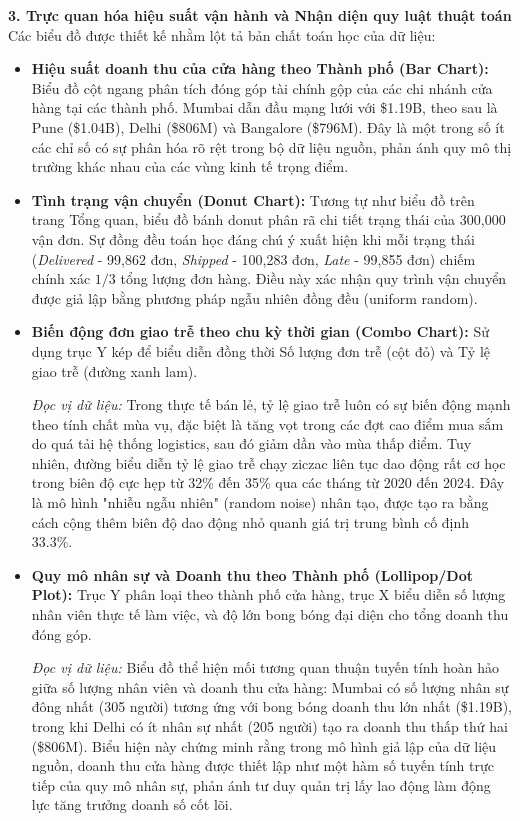 \textbf{3. Trực quan hóa hiệu suất vận hành và Nhận diện quy luật thuật toán} \\
Các biểu đồ được thiết kế nhằm lột tả bản chất toán học của dữ liệu:
\begin{itemize}
    \item \textbf{Hiệu suất doanh thu của cửa hàng theo Thành phố (Bar Chart):} 
    Biểu đồ cột ngang phân tích đóng góp tài chính gộp của các chi nhánh cửa hàng tại các thành phố. Mumbai dẫn đầu mạng lưới với \$1.19B, theo sau là Pune (\$1.04B), Delhi (\$806M) và Bangalore (\$796M). Đây là một trong số ít các chỉ số có sự phân hóa rõ rệt trong bộ dữ liệu nguồn, phản ánh quy mô thị trường khác nhau của các vùng kinh tế trọng điểm.
    
    \item \textbf{Tình trạng vận chuyển (Donut Chart):} 
    Tương tự như biểu đồ trên trang Tổng quan, biểu đồ bánh donut phân rã chi tiết trạng thái của 300,000 vận đơn. Sự đồng đều toán học đáng chú ý xuất hiện khi mỗi trạng thái (\textit{Delivered} - 99,862 đơn, \textit{Shipped} - 100,283 đơn, \textit{Late} - 99,855 đơn) chiếm chính xác $1/3$ tổng lượng đơn hàng. Điều này xác nhận quy trình vận chuyển được giả lập bằng phương pháp ngẫu nhiên đồng đều (uniform random).
    
    \item \textbf{Biến động đơn giao trễ theo chu kỳ thời gian (Combo Chart):} 
    Sử dụng trục Y kép để biểu diễn đồng thời Số lượng đơn trễ (cột đỏ) và Tỷ lệ giao trễ (đường xanh lam). 
    
    \textit{Đọc vị dữ liệu:} Trong thực tế bán lẻ, tỷ lệ giao trễ luôn có sự biến động mạnh theo tính chất mùa vụ, đặc biệt là tăng vọt trong các đợt cao điểm mua sắm do quá tải hệ thống logistics, sau đó giảm dần vào mùa thấp điểm. Tuy nhiên, đường biểu diễn tỷ lệ giao trễ chạy ziczac liên tục dao động rất cơ học trong biên độ cực hẹp từ 32\% đến 35\% qua các tháng từ 2020 đến 2024. Đây là mô hình "nhiễu ngẫu nhiên" (random noise) nhân tạo, được tạo ra bằng cách cộng thêm biên độ dao động nhỏ quanh giá trị trung bình cố định 33.3\%.
    
    \item \textbf{Quy mô nhân sự và Doanh thu theo Thành phố (Lollipop/Dot Plot):} 
    Trục Y phân loại theo thành phố cửa hàng, trục X biểu diễn số lượng nhân viên thực tế làm việc, và độ lớn bong bóng đại diện cho tổng doanh thu đóng góp.
    
    \textit{Đọc vị dữ liệu:} Biểu đồ thể hiện mối tương quan thuận tuyến tính hoàn hảo giữa số lượng nhân viên và doanh thu cửa hàng: Mumbai có số lượng nhân sự đông nhất (305 người) tương ứng với bong bóng doanh thu lớn nhất (\$1.19B), trong khi Delhi có ít nhân sự nhất (205 người) tạo ra doanh thu thấp thứ hai (\$806M). Biểu hiện này chứng minh rằng trong mô hình giả lập của dữ liệu nguồn, doanh thu cửa hàng được thiết lập như một hàm số tuyến tính trực tiếp của quy mô nhân sự, phản ánh tư duy quản trị lấy lao động làm động lực tăng trưởng doanh số cốt lõi.
\end{itemize}